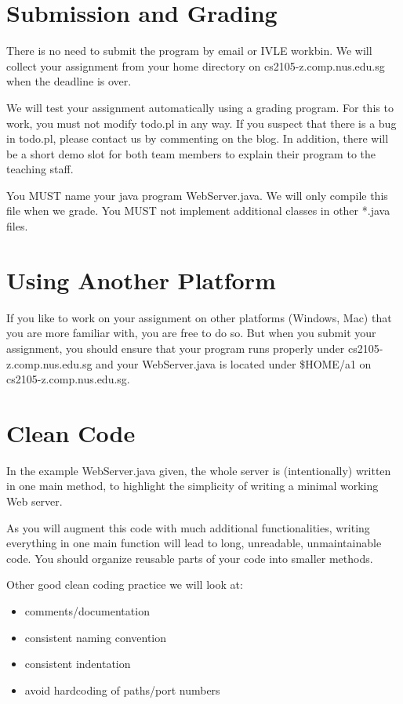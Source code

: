 \documentclass[a4paper,11pt]{exam}
\begin{document}
\section*{Submission and Grading}

There is no need to submit the program by email or IVLE workbin. We will collect your assignment from your home directory on cs2105-z.comp.nus.edu.sg when the deadline is over.

We will test your assignment automatically using a grading program. For this to work, you must not modify todo.pl in any way. If you suspect that there is a bug in todo.pl, please contact us by commenting on the blog.  In addition, there will be a short demo slot for both team members to explain their program to the teaching staff. 

You MUST name your java program WebServer.java. We will only compile this file when we grade. You MUST not implement additional classes in other *.java files.

\section*{Using Another Platform}

If you like to work on your assignment on other platforms (Windows, Mac) that you are more familiar with, you are free to do so. But when you submit your assignment, you should ensure that your program runs properly under cs2105-z.comp.nus.edu.sg and your WebServer.java is located under \$HOME/a1 on cs2105-z.comp.nus.edu.sg.

\section*{Clean Code}

In the example WebServer.java given, the whole server is (intentionally) written in one main method, to highlight the simplicity of writing a minimal working Web server.

As you will augment this code with much additional functionalities, writing everything in one main function will lead to long, unreadable, unmaintainable code.  You should organize reusable parts of your code into smaller methods.

Other good clean coding practice we will look at:
\begin{itemize}
	\item comments/documentation
	\item consistent naming convention
	\item consistent indentation
	\item avoid hardcoding of paths/port numbers
\end{itemize}
\end{document}
